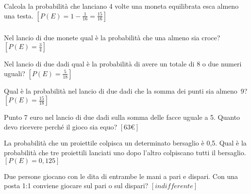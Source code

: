 \begin{esercizio}[\Ast]
 \label{ese:9.46}
Calcola la probabilità che lanciano 4 volte una moneta equilibrata esca almeno 
una testa.
\hfill $\left[P(E)=1-\frac 1{16}=\frac{15}{16}\right]$
\end{esercizio}

\subsubsection*{}

\begin{esercizio}[\Ast]
 \label{ese:9.47}
Nel lancio di due monete qual è la probabilità che una almeno sia croce?
\hfill $\left[P(E)=\frac 3 4\right]$
\end{esercizio}

\begin{esercizio}[\Ast]
 \label{ese:9.48}
Nel lancio di due dadi qual è la probabilità di avere un totale di 8 o due 
numeri uguali?
\hfill $\left[P(E)=\frac 5{18}\right]$
\end{esercizio}

\begin{esercizio}[\Ast]
 \label{ese:9.49}
Qual è la probabilità nel lancio di due dadi che la somma dei punti sia 
almeno~9?
\hfill $\left[P(E)=\frac{15}{18}\right]$
\end{esercizio}

\begin{esercizio}[\Ast]
 \label{ese:9.50}
Punto 7 euro nel lancio di due dadi sulla somma delle facce uguale a 5. Quanto 
devo ricevere perché il gioco sia equo?
\hfill $\left[63\text{€}\right]$
\end{esercizio}

\begin{esercizio}[\Ast]
 \label{ese:9.51}
La probabilità che un proiettile colpisca un determinato bersaglio è 0,5. Qual è 
la probabilità che tre proiettili lanciati uno dopo l'altro colpiscano tutti il 
bersaglio.
\hfill $\left[P(E)=0,125\right]$
\end{esercizio}

\begin{esercizio}[\Ast]
 \label{ese:9.52}
Due persone giocano con le dita di entrambe le mani a pari e dispari. Con una 
posta 1:1 conviene giocare sul pari o sul dispari?
\hfill $\left[indifferente\right]$
\end{esercizio}


